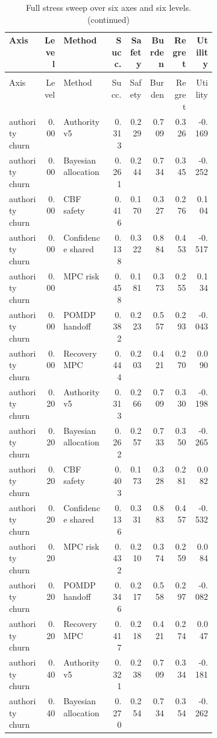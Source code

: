 \documentclass{article}
\begin{document}
\begin{center}
\tiny
\begin{longtable}{p{0.17\linewidth}rp{0.23\linewidth}rrrrr}
\caption{Full stress sweep over six axes and six levels.}\label{tab:stress}\\
\toprule
Axis & Level & Method & Succ. & Safety & Burden & Regret & Utility\\
\midrule
\endfirsthead
\caption[]{Full stress sweep over six axes and six levels. (continued)}\\
\toprule
Axis & Level & Method & Succ. & Safety & Burden & Regret & Utility\\
\midrule
\endhead
authority churn & 0.00 & Authority v5 & 0.313 & 0.229 & 0.709 & 0.326 & -0.169\\
authority churn & 0.00 & Bayesian allocation & 0.261 & 0.244 & 0.734 & 0.345 & -0.252\\
authority churn & 0.00 & CBF safety & 0.416 & 0.170 & 0.327 & 0.276 & 0.104\\
authority churn & 0.00 & Confidence shared & 0.138 & 0.322 & 0.884 & 0.453 & -0.517\\
authority churn & 0.00 & MPC risk & 0.458 & 0.181 & 0.373 & 0.255 & 0.134\\
authority churn & 0.00 & POMDP handoff & 0.382 & 0.223 & 0.557 & 0.293 & -0.043\\
authority churn & 0.00 & Recovery MPC & 0.444 & 0.203 & 0.421 & 0.270 & 0.090\\
authority churn & 0.20 & Authority v5 & 0.313 & 0.266 & 0.709 & 0.330 & -0.198\\
authority churn & 0.20 & Bayesian allocation & 0.262 & 0.257 & 0.733 & 0.350 & -0.265\\
authority churn & 0.20 & CBF safety & 0.403 & 0.173 & 0.328 & 0.281 & 0.082\\
authority churn & 0.20 & Confidence shared & 0.136 & 0.331 & 0.883 & 0.457 & -0.532\\
authority churn & 0.20 & MPC risk & 0.432 & 0.210 & 0.374 & 0.259 & 0.084\\
authority churn & 0.20 & POMDP handoff & 0.346 & 0.217 & 0.558 & 0.297 & -0.082\\
authority churn & 0.20 & Recovery MPC & 0.417 & 0.218 & 0.421 & 0.274 & 0.047\\
authority churn & 0.40 & Authority v5 & 0.321 & 0.238 & 0.709 & 0.334 & -0.181\\
authority churn & 0.40 & Bayesian allocation & 0.270 & 0.254 & 0.734 & 0.354 & -0.262\\

\end{longtable}
\end{center}
\end{document}
